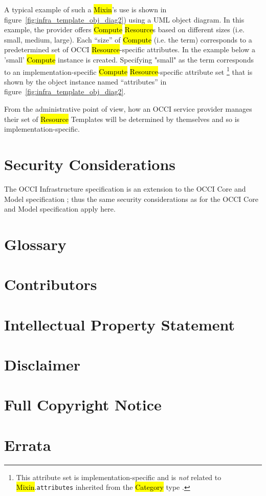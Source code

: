 \documentclass[10pt,a4paper]{article}
\begin{document}
A typical example of such a \hl{Mixin}'s use is shown in
figure~\ref{fig:infra_template_obj_diag2}) using a UML object diagram.
In this example, the provider offers \hl{Compute} \hl{Resource}s based
on different sizes (i.e. small, medium, large). Each ``size'' of
\hl{Compute} (i.e. the term) corresponds to a predetermined set of
OCCI \hl{Resource}-specific attributes. In the example below a 'small'
\hl{Compute} instance is created.  Specifying "small" as the term
corresponds to an implementation-specific \hl{Compute}
\hl{Resource}-specific attribute set%
\footnote{This attribute set is implementation-specific and is {\em
    not} related to \hl{Mixin}.{\tt attributes} inherited from the
  \hl{Category} type \cite{occi:core}.}  that is shown by the object
instance named ``attributes'' in
figure~\ref{fig:infra_template_obj_diag2}.


From the administrative point of view, how an OCCI service provider
manages their set of \hl{Resource} Templates will be determined by
themselves and so is implementation-specific.


\section{Security Considerations}
The OCCI Infrastructure specification is an extension to the OCCI Core
and Model specification \cite{occi:core}; thus the same security
considerations as for the OCCI Core and Model specification apply
here.

\section{Glossary}
\label{sec:glossary}


\section{Contributors}


\section{Intellectual Property Statement}


\section{Disclaimer}


\section{Full Copyright Notice}





\appendix

\newpage
\section{Errata}
\label{sec:errata}
\end{document}
